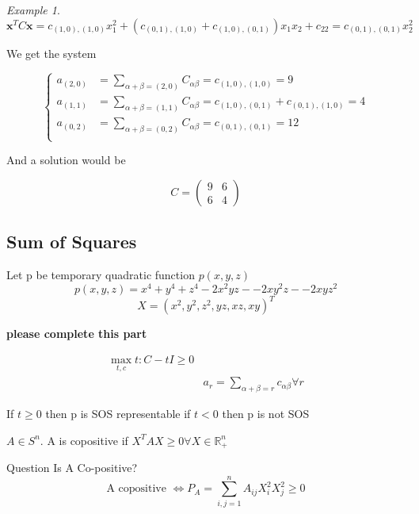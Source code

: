 \documentclass[onecolumn,11pt,a4paper]{article}
\theoremstyle{plain}  %
\theoremstyle{remark}  %
\newtheorem{example}[theorem]{Example}
\begin{document}
\begin{example}
\[
	\mathbf{x}^T C \mathbf{x} = c_{(1, 0),(1, 0)} x_1^2 + \left( c_{(0, 1),(1, 0)} + c_{(1,
	0),(0,1)} \right) x_1 x_2 + c_{22} = c_{(0, 1),(0, 1)} x_2^2
\]

We get the system

\begin{equation*}
	\left\{ \begin{aligned}
		a_{(2,0)} & = \sum_{\alpha + \beta = (2, 0)} C_{\alpha \beta} = c_{(1, 0),(1,
		0)} = 9\\
		a_{(1,1)} & = \sum_{\alpha + \beta = (1, 1)} C_{\alpha \beta} = c_{(1, 0),(0, 1)}
		+ c_{(0, 1),(1, 0)} = 4\\
		a_{(0,2)} & = \sum_{\alpha + \beta = (0, 2)} C_{\alpha \beta} = c_{(0, 1),(0,
		1)} = 12\\
	\end{aligned} \right.
\end{equation*}

And a solution would be

\begin{equation*}
	C = \begin{pmatrix}9 & 6 \\ 6 & 4 \end{pmatrix} 
\end{equation*}

\end{example}

\subsection{Sum of Squares}

Let p be temporary quadratic function  $p(x,y,z)$
\[ 
p(x,y,z) = x^4 + y^4 + z^4 - 2x^2yz -  - 2xy^2z -  - 2xyz^2 
\]
\[
X= ( x^2, y^2, z^2, yz, xz, xy)^T 
\]

\textbf{please complete this part}



\begin{align}
\max_{t, c} t: C - tI \geq 0 \\
& a_r = \sum_{\alpha + \beta= r} c_{\alpha  \beta} \forall r
\end{align}

If $t \geq 0 $ then p is SOS representable
if $t<0$ then p is not SOS

$A \in S^n $. A is copositive if $X^T A X \geq 0 \forall X \in \mathbb{R}_{+}^n$ 

Question Is A Co-positive?
\[
\text{A copositive } \Leftrightarrow P_A =\sum_{i, j = 1}^n A_{ij}X_i^2 X_j^2  \geq 0 \]
\newpage
\nocite{afonin2020extreme}

\end{document}
